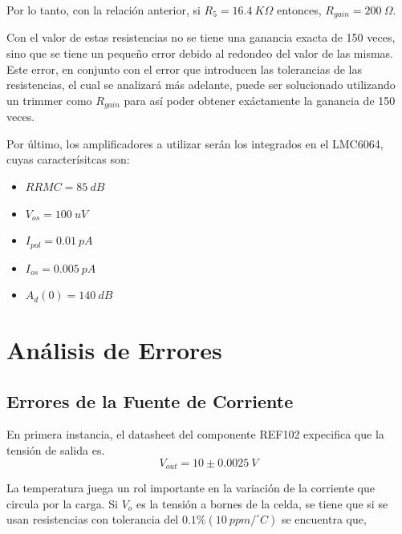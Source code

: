 \documentclass[12pt,A4paper,titlepage]{article}
\begin{document}
\hspace{1mm} Por lo tanto, con la relación anterior, si \(R_5=16.4~K\Omega \) entonces, \(R_{gain}=200~\Omega \).

\bigskip
\hspace{1mm} Con el valor de estas resistencias no se tiene una ganancia exacta de 150 veces, sino que se tiene un pequeño error debido al redondeo del valor de las mismas. Este error, en conjunto con el error que introducen las tolerancias de las resistencias, el cual se analizará más adelante, puede ser solucionado utilizando un trimmer como \( R_{gain} \) para así poder obtener exáctamente la ganancia de 150 veces.

\bigskip
\hspace{1mm} Por último, los amplificadores a utilizar serán los integrados en el LMC6064, cuyas caracterísitcas son:

\begin{itemize}
    \item \(RRMC=85~dB\)
    \item \(V_{os} = 100~uV \)
    \item \(I_{pol} = 0.01~pA \)
    \item \(I_{os}=0.005~pA \)
    \item \(A_d(0)=140~dB \)
\end{itemize}



\section{Análisis de Errores}

\subsection{Errores de la Fuente de Corriente}

\hspace{1mm} En primera instancia, el datasheet del componente REF102 expecifica que la tensión de salida es.
\bigskip
\begin{equation}
    V_{out} = 10 \pm 0.0025~V
\end{equation}

\bigskip
\hspace{1mm} La temperatura juega un rol importante en la variación de la corriente que circula por la carga. Si \(V_o\) es la tensión a bornes de la celda, se tiene que si se usan resistencias con tolerancia del \(0.1\% (10~ppm / ^\circ C)\) se encuentra que,
\end{document}
